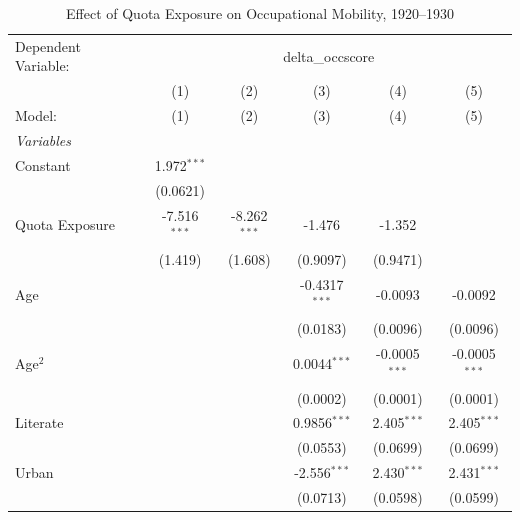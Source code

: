 
\begin{table}[htbp]
   \caption{\label{tab:main} Effect of Quota Exposure on Occupational Mobility, 1920--1930}
   \centering
   \begin{tabular}{lccccc}
      \tabularnewline \midrule \midrule
      Dependent Variable: & \multicolumn{5}{c}{delta\_occscore}\\
                             & (1)            & (2)            & (3)             & (4)             & (5) \\   
      Model:                 & (1)            & (2)            & (3)             & (4)             & (5)\\  
      \midrule
      \emph{Variables}\\
      Constant               & 1.972$^{***}$  &                &                 &                 &   \\   
                             & (0.0621)       &                &                 &                 &   \\   
      Quota Exposure         & -7.516$^{***}$ & -8.262$^{***}$ & -1.476          & -1.352          &   \\   
                             & (1.419)        & (1.608)        & (0.9097)        & (0.9471)        &   \\   
      Age                    &                &                & -0.4317$^{***}$ & -0.0093         & -0.0092\\   
                             &                &                & (0.0183)        & (0.0096)        & (0.0096)\\   
      Age$^2$                &                &                & 0.0044$^{***}$  & -0.0005$^{***}$ & -0.0005$^{***}$\\   
                             &                &                & (0.0002)        & (0.0001)        & (0.0001)\\   
      Literate               &                &                & 0.9856$^{***}$  & 2.405$^{***}$   & 2.405$^{***}$\\   
                             &                &                & (0.0553)        & (0.0699)        & (0.0699)\\   
      Urban                  &                &                & -2.556$^{***}$  & 2.430$^{***}$   & 2.431$^{***}$\\   
                             &                &                & (0.0713)        & (0.0598)        & (0.0599)\\   

\end{tabular}
\end{table}
